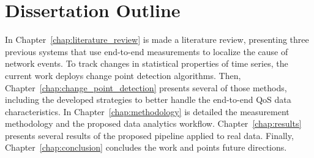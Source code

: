 \section{Dissertation Outline}

In Chapter~\ref{chap:literature_review} is made a literature review, presenting
three previous systems that use
end-to-end measurements to localize the cause of network events.
To track changes in statistical properties of time series, the current
work deploys change point detection algorithms. Then,
Chapter~\ref{chap:change_point_detection} presents several of those methods,
including the developed strategies to better handle the end-to-end QoS data
characteristics.
In Chapter~\ref{chap:methodology} is detailed the measurement methodology and
the proposed data analytics workflow.
Chapter~\ref{chap:results} presents several results of the proposed pipeline
applied to real data.
Finally, Chapter~\ref{chap:conclusion} concludes the work and
points future directions.
